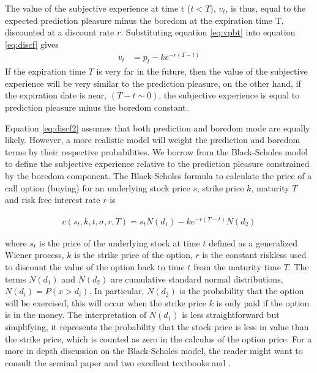 \documentclass[11pt,twocolumn]{article}
\begin{document}
The value of the subjective experience at time t ($t <T$), $v_t$, is thus, equal to the expected prediction pleasure minus the boredom at the expiration time T, discounted at a discount rate $r$. Substituting equation \ref{eq:vpbt} into equation \ref{eq:discf} gives
\begin{equation}
\begin{split}
    v_t  & =  p_{t} - k e^{-r(T-t)}
\end{split}
\label{eq:discf2}
\end{equation}
If the expiration time $T$ is very far in the future, then the value of the subjective experience will be very similar to the prediction pleasure, on the other hand, if the expiration date is near, $(T-t \sim 0)$, the subjective experience is equal to prediction pleasure minus the boredom constant. 

Equation \ref{eq:discf2} assumes that both prediction and boredom mode are equally likely. 
However, a more realistic model will weight the prediction and boredom terms by their respective probabilities. We borrow from the Black-Scholes model to define the subjective experience relative to the prediction pleasure constrained by the boredom component.
The Black-Scholes formula to calculate the price of a call option (buying) for an underlying stock  price $s$, strike price $k$, maturity $T$ and risk free interest rate $r$ is 

\begin{equation}
\begin{split}
 c(s_t,k,t,\sigma,r,T)  = s_t N(d_1) - k e^{-r(T-t)}N(d_2)
 \end{split}
  \label{eq:bsmcall}
\end{equation}
 
where $s_t$ is the price of the underlying stock at time $t$ defined as a generalized Wiener process, $k$ is the strike price of the option, $r$ is the constant riskless 
used to discount the value of the option back to time $t$ from the maturity time $T$.
The terms $N(d_1)$ and $N(d_2)$ are cumulative standard normal distributions, $N(d_i) = P(x > d_i)$. In particular, $N(d_2)$ is the probability
that the option will be exercised, this will occur when the strike price $k$ is only paid if the option is in the money. The interpretation of $N(d_1)$ is less straightforward but simplifying, it represents the probability that the stock price is less in value than the strike price, which is counted as zero in the calculus of the option price. For a more in depth discussion on the Black-Scholes model, the reader might want to consult the seminal paper \citep{black_pricing_1973} and two excellent textbooks \citep{hull_options_2005} and \citep{duffie_dynamic_2001}.
\end{document}
